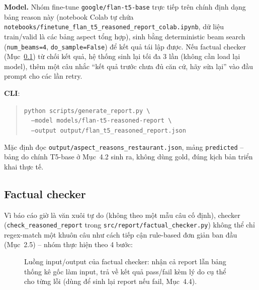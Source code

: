 \documentclass[11pt,a4paper]{article}
\begin{document}
\textbf{Model.} Nhóm fine-tune \texttt{google/\allowbreak flan-\allowbreak t5-\allowbreak base} trực tiếp trên
chính định dạng bảng reason này (notebook Colab tự chứa
\texttt{notebooks/\allowbreak finetune\_\allowbreak flan\_\allowbreak t5\_\allowbreak reasoned\_\allowbreak report\_\allowbreak colab.ipynb}, dữ
liệu train/valid là các bảng aspect tổng hợp), sinh bằng deterministic beam
search (\texttt{num\_beams=4}, \texttt{do\_sample=False}) để kết quả tái
lập được. Nếu factual checker (Mục~\ref{sec:factualchecker}) từ chối kết
quả, hệ thống sinh lại tối đa 3 lần (không cần load lại model), thêm một
câu nhắc ``kết quả trước chưa đủ căn cứ, hãy sửa lại'' vào đầu prompt cho
các lần retry.

\textbf{CLI}:

\begin{quote}
\small
\texttt{python scripts/generate\_report.py \textbackslash} \\
\texttt{~~--model models/flan-t5-reasoned-report \textbackslash} \\
\texttt{~~--output output/flan\_t5\_reasoned\_report.json}
\end{quote}

Mặc định đọc \texttt{output/\allowbreak aspect\_\allowbreak reasons\_\allowbreak restaurant.json}, mảng
\texttt{predicted} -- bảng do chính T5-base ở Mục~4.2 sinh ra, không dùng
gold, đúng kịch bản triển khai thực tế.

\subsection{Factual checker}
\label{sec:factualchecker}

Vì báo cáo giờ là văn xuôi tự do (không theo một mẫu câu cố định), checker
(\texttt{check\_reasoned\_report} trong \texttt{src/\allowbreak report/\allowbreak factual\_\allowbreak checker.py})
không thể chỉ regex-match một khuôn câu như cách tiếp cận rule-based đơn
giản ban đầu (Mục~2.5) -- nhóm thực hiện theo 4 bước:

\begin{figure}[h]
\centering
{}
\caption{Luồng input/output của factual checker: nhận cả report lẫn bảng
thống kê gốc làm input, trả về kết quả pass/fail kèm lý do cụ thể cho
từng lỗi (dùng để sinh lại report nếu fail, Mục~4.4).}
\end{figure}
\end{document}
